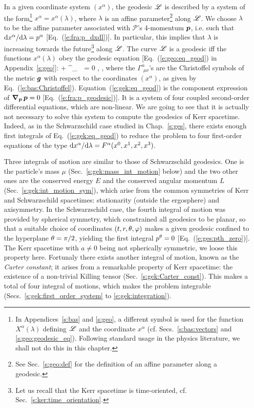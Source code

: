 In a given coordinate system $(x^\alpha)$, the geodesic $\mathscr{L}$ is described
by a system of the form\footnote{In Appendices~\ref{s:bas} and \ref{s:geo},
a different symbol is used for the function $X^\alpha(\lambda)$ defining
$\mathscr{L}$ and the coordinate $x^\alpha$ (cf. Secs.~\ref{s:bas:vectors} and
\ref{s:geo:geodesic_eq}). Following standard usage in the physics literature,
we shall not do this in this chapter.}
$x^\alpha = x^\alpha(\lambda)$, where $\lambda$ is an
affine parameter\footnote{See Sec.~\ref{s:geo:def} for the definition
of an affine parameter along a geodesic.} along $\mathscr{L}$. We choose $\lambda$ to be the affine parameter
associated with $\mathscr{P}$'s 4-momentum $\bm{p}$,
i.e. such that $\mathrm{d} x^\alpha / \mathrm{d}\lambda = p^\alpha$ [Eq.~(\ref{e:fra:p_dxdl})].
In particular, this implies that $\lambda$ is increasing towards the future\footnote{Let us recall that the Kerr spacetime is time-oriented, cf. Sec.~\ref{s:ker:time_orientation}.} along $\mathscr{L}$.
The curve $\mathscr{L}$ is a geodesic iff the functions $x^\alpha(\lambda)$ obey
the geodesic equation [Eq.~(\ref{e:geo:eq_geod}) in Appendix~\ref{s:geo}]:
\be \label{e:gek:eq_geod}
     + \Gamma^\alpha_{\ \, \mu \nu}
      = 0 , \leq \alpha {},
\ee
where the $\Gamma^\alpha_{\ \, \mu \nu}$'s are the Christoffel symbols of the metric $\bm{g}$
with respect to the coordinates $(x^\alpha)$, as given by Eq.~(\ref{e:bas:Christoffel}).
Equation~(\ref{e:gek:eq_geod}) is the component expression of
$\bm{\nabla}_{\bm{p}} \, \bm{p} = 0$ [Eq.~(\ref{e:fra:p_geodesic})]. It is
a system of four coupled second-order
differential equations, which are non-linear. We are going to see that it is actually not necessary to
solve this system to compute the geodesics of Kerr spacetime. Indeed,
as in the Schwarzschild case studied in Chap.~\ref{s:ges}, there exists
enough first integrals of Eq.~(\ref{e:gek:eq_geod}) to reduce
the problem to four first-order equations
of the type $\mathrm{d} x^\alpha/\mathrm{d}\lambda = F^\alpha(x^0, x^1, x^2, x^3)$.

Three integrals of motion are similar to those of Schwarzschild geodesics.
One is the particle's mass $\mu$ (Sec.~\ref{s:gek:mass_int_motion} below)
and the two other ones are
the conserved energy $E$ and the conserved angular momentum
$L$ (Sec.~\ref{s:gek:int_motion_sym}), which arise from the common symmetries
of Kerr and Schwarzschild spacetimes: stationarity (outside the ergosphere) and axisymmetry.
In the Schwarzschild case, the fourth integral of motion was provided by
spherical symmetry, which constrained all geodesics to be planar, so that
a suitable choice of
coordinates $(t,r,\theta,\varphi)$ makes a given geodesic confined to the
hyperplane $\theta=\pi/2$, yielding the first integral $p^\theta=0$ [Eq.~(\ref{e:ges:pth_zero})].
The Kerr spacetime with $a\not=0$ being not spherically symmetric, we loose
this property here. Fortunaly there exists another
integral of motion, known as the \emph{Carter constant}; it arises from a remarkable property
of Kerr spacetime: the existence of a non-trivial Killing tensor (Sec.~\ref{s:gek:Carter_const}).
This makes a total of four integral of motions,
which makes the problem integrable (Secs.~\ref{s:gek:first_order_system} to
\ref{e:gek:integration}).


